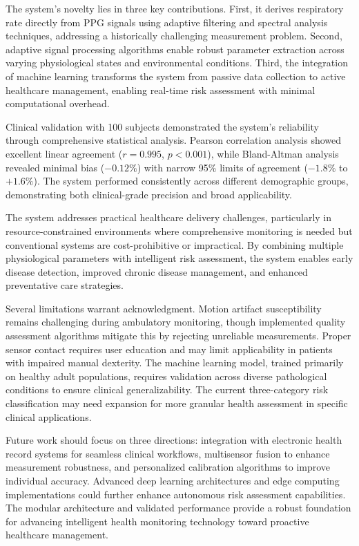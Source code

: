 \documentclass{ieeeaccess}
\begin{document}
The system's novelty lies in three key contributions. First, it derives respiratory rate directly from PPG signals using adaptive filtering and spectral analysis techniques, addressing a historically challenging measurement problem. Second, adaptive signal processing algorithms enable robust parameter extraction across varying physiological states and environmental conditions. Third, the integration of machine learning transforms the system from passive data collection to active healthcare management, enabling real-time risk assessment with minimal computational overhead.

Clinical validation with 100 subjects demonstrated the system's reliability through comprehensive statistical analysis. Pearson correlation analysis showed excellent linear agreement ($r = 0.995$, $p < 0.001$), while Bland-Altman analysis revealed minimal bias ($-0.12\%$) with narrow 95\% limits of agreement ($-1.8\%$ to $+1.6\%$). The system performed consistently across different demographic groups, demonstrating both clinical-grade precision and broad applicability.

The system addresses practical healthcare delivery challenges, particularly in resource-constrained environments where comprehensive monitoring is needed but conventional systems are cost-prohibitive or impractical. By combining multiple physiological parameters with intelligent risk assessment, the system enables early disease detection, improved chronic disease management, and enhanced preventative care strategies.

Several limitations warrant acknowledgment. Motion artifact susceptibility remains challenging during ambulatory monitoring, though implemented quality assessment algorithms mitigate this by rejecting unreliable measurements. Proper sensor contact requires user education and may limit applicability in patients with impaired manual dexterity. The machine learning model, trained primarily on healthy adult populations, requires validation across diverse pathological conditions to ensure clinical generalizability. The current three-category risk classification may need expansion for more granular health assessment in specific clinical applications.

Future work should focus on three directions: integration with electronic health record systems for seamless clinical workflows, multisensor fusion to enhance measurement robustness, and personalized calibration algorithms to improve individual accuracy. Advanced deep learning architectures and edge computing implementations could further enhance autonomous risk assessment capabilities. The modular architecture and validated performance provide a robust foundation for advancing intelligent health monitoring technology toward proactive healthcare management.
\end{document}
